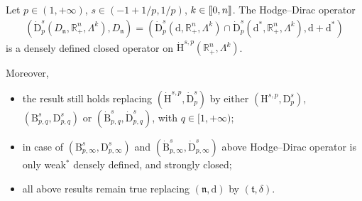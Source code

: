\documentclass[AHL,Unicode,longabstracts,published]{cedram}
\newcommand{\bbR}{\mathbb{R}}
\newcommand{\rmH}{\mathrm{H}}%
\newcommand{\rmB}{\mathrm{B}}
\newcommand{\rmd}{\mathrm{d}}
\newcommand{\rmD}{\mathrm{D}}
\newcommand{\fkn}{\mathfrak{n}}
\newcommand{\fkt}{\mathfrak{t}}
\newcommand{\llbracket}{\mathopen{[\mkern -2.7mu[}}
\newcommand{\rrbracket}{\mathclose{]\mkern -2.7mu]}}
\newcommand{\llb}{\llbracket}
\newcommand{\rrb}{\rrbracket}
\begin{document}
\begin{prop}\label{prop2.27}
Let $p\in(1,+\infty)$, $s\in(-1+1/p,1/p)$, $k\in\llb 0,n \rrb$. The Hodge--Dirac operator
\begin{align*}
\left(\dot{\rmD}^{s}_{p}\left(D_\fkn,\bbR^n_+,\Lambda^k\right),D_\fkn\right)=
\left(\dot{\rmD}^{s}_{p}\left(\rmd,\bbR^n_+,\Lambda^k\right)\cap \dot{\rmD}^{s}_{p}\left(\rmd^\ast,\bbR^n_+,\Lambda^k\right),\rmd+\rmd^\ast\right)
\end{align*}
is a densely defined closed operator on $\dot{\rmH}^{s,p}(\bbR^n_+,\Lambda^k)$.

Moreover,
\begin{itemize}
\item the result still holds replacing $(\dot{\rmH}^{s,p},\dot{\rmD}^{s}_{p})$ by either $({\rmH}^{s,p},{\rmD}^{s}_{p})$, $(\rmB^{s}_{p,q},\rmD^{s}_{p,q})$ or $(\dot{\rmB}^{s}_{p,q},\dot{\rmD}^{s}_{p,q})$, with $q\in[1,+\infty)$;

\item in case of $(\rmB^{s}_{p,\infty},\rmD^{s}_{p,\infty})$ and $(\dot{\rmB}^{s}_{p,\infty},\dot{\rmD}^{s}_{p,\infty})$ above Hodge--Dirac operator is only weak${}^\ast$ densely defined, and strongly closed;

\item all above results remain true replacing $(\fkn,\rmd)$ by $(\fkt,\delta)$.
\end{itemize}
\end{prop}
\end{document}
